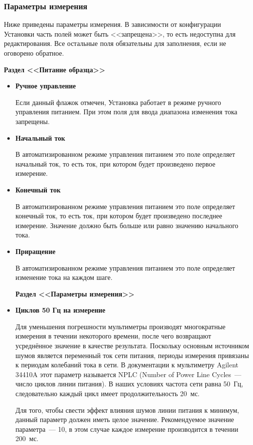 \documentclass[12pt, a4paper, twocolumn]{report}
\newcommand{\PARAM}[1]{\item {\bf #1} }
\newcommand{\PARAMSECTION}[1]{\vbox{}{\bf Раздел <<#1>>}}
\begin{document}
\subsubsection{Параметры измерения}

Ниже приведены параметры измерения. В зависимости от конфигурации Установки часть полей может быть <<запрещена>>, то есть недоступна для редактирования. Все остальные поля обязательны для заполнения, если не оговорено обратное.

\PARAMSECTION{Питание образца}

\begin{itemize}

\PARAM{Ручное управление}

Если данный флажок отмечен, Установка работает в режиме ручного управления питанием. При этом поля для ввода диапазона изменения тока запрещены.

\PARAM{Начальный ток}

В автоматизированном режиме управления питанием это поле определяет начальный ток, то есть ток, при котором будет произведено первое измерение.

\PARAM{Конечный ток}

В автоматизированном режиме управления питанием это поле определяет конечный ток, то есть ток, при котором будет произведено последнее измерение. Значение должно быть больше или равно значению начального тока.

\PARAM{Приращение}

В автоматизированном режиме управления питанием это поле определяет изменение тока на каждом шаге.

\PARAMSECTION{Параметры измерения}

\PARAM{Циклов 50 Гц на измерение}

Для уменьшения погрешности мультиметры производят многократные измерения в течении некоторого времени, после чего возвращают усреднённое значение в качестве результата. Поскольку основным источником шумов является переменный ток сети питания, периоды измерения привязаны к периодам колебаний тока в сети. В документации к мультиметру Agilent 34410A этот параметр называется NPLC (Number of Power Line Cycles~--- число циклов линии питания). В наших условиях частота сети равна 50~Гц, следовательно каждый цикл имеет продолжительность 20~мс.

Для того, чтобы свести эффект влияния шумов  линии питания к минимум, данный параметр должен иметь целое значение. Рекомендуемое значение параметра~--- 10, в этом случае каждое измерение производится в течении 200~мс.


\end{itemize}
\end{document}
